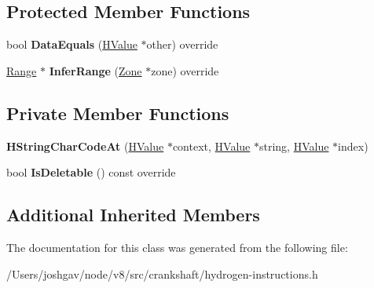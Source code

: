 \subsection*{Protected Member Functions}
\begin{DoxyCompactItemize}
\item 
bool {\bfseries Data\+Equals} (\hyperlink{classv8_1_1internal_1_1_h_value}{H\+Value} $\ast$other) override\hypertarget{classv8_1_1internal_1_1_h_string_char_code_at_ab9f18f69e9fbcec6ac258ae65f45b175}{}\label{classv8_1_1internal_1_1_h_string_char_code_at_ab9f18f69e9fbcec6ac258ae65f45b175}

\item 
\hyperlink{classv8_1_1internal_1_1_range}{Range} $\ast$ {\bfseries Infer\+Range} (\hyperlink{classv8_1_1internal_1_1_zone}{Zone} $\ast$zone) override\hypertarget{classv8_1_1internal_1_1_h_string_char_code_at_a3c9a05492c2c791c70292fe6eadedf5c}{}\label{classv8_1_1internal_1_1_h_string_char_code_at_a3c9a05492c2c791c70292fe6eadedf5c}

\end{DoxyCompactItemize}
\subsection*{Private Member Functions}
\begin{DoxyCompactItemize}
\item 
{\bfseries H\+String\+Char\+Code\+At} (\hyperlink{classv8_1_1internal_1_1_h_value}{H\+Value} $\ast$context, \hyperlink{classv8_1_1internal_1_1_h_value}{H\+Value} $\ast$string, \hyperlink{classv8_1_1internal_1_1_h_value}{H\+Value} $\ast$index)\hypertarget{classv8_1_1internal_1_1_h_string_char_code_at_a05dd70ec20375a03590d1936291fbb79}{}\label{classv8_1_1internal_1_1_h_string_char_code_at_a05dd70ec20375a03590d1936291fbb79}

\item 
bool {\bfseries Is\+Deletable} () const  override\hypertarget{classv8_1_1internal_1_1_h_string_char_code_at_a5a1a5896f2b60bbb067c418fd3a5405f}{}\label{classv8_1_1internal_1_1_h_string_char_code_at_a5a1a5896f2b60bbb067c418fd3a5405f}

\end{DoxyCompactItemize}
\subsection*{Additional Inherited Members}


The documentation for this class was generated from the following file\+:\begin{DoxyCompactItemize}
\item 
/\+Users/joshgav/node/v8/src/crankshaft/hydrogen-\/instructions.\+h\end{DoxyCompactItemize}
